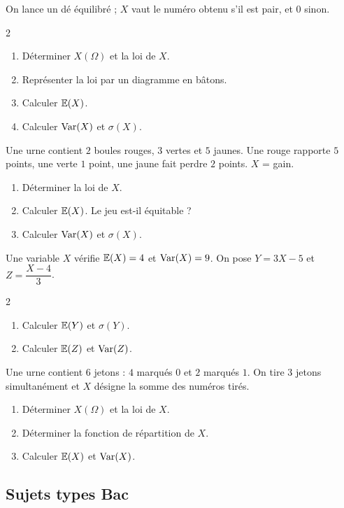On lance un dé équilibré ; $X$ vaut le numéro obtenu s'il est pair, et $0$
sinon.
\begin{multicols}{2}
\begin{enumerate}
	\item Déterminer $X(\Omega)$ et la loi de $X$.
	\item Représenter la loi par un diagramme en bâtons.
	\item Calculer $\mathbb{E}(X)$.
	\item Calculer $\mathrm{Var}(X)$ et $\sigma(X)$.
\end{enumerate}
\end{multicols}

Une urne contient $2$ boules rouges, $3$ vertes et $5$ jaunes. Une rouge
rapporte $5$ points, une verte $1$ point, une jaune fait perdre $2$ points.
$X$ = gain.
\begin{enumerate}
	\item Déterminer la loi de $X$.
	\item Calculer $\mathbb{E}(X)$. Le jeu est-il équitable ?
	\item Calculer $\mathrm{Var}(X)$ et $\sigma(X)$.
\end{enumerate}

Une variable $X$ vérifie $\mathbb{E}(X)=4$ et $\mathrm{Var}(X)=9$. On pose $Y=3X-5$ et
$Z=\dfrac{X-4}{3}$.
\begin{multicols}{2}
\begin{enumerate}
	\item Calculer $\mathbb{E}(Y)$ et $\sigma(Y)$.
	\item Calculer $\mathbb{E}(Z)$ et $\mathrm{Var}(Z)$.
\end{enumerate}
\end{multicols}

Une urne contient $6$ jetons : $4$ marqués $0$ et $2$ marqués $1$. On tire
$3$ jetons simultanément et $X$ désigne la somme des numéros tirés.
\begin{enumerate}
	\item Déterminer $X(\Omega)$ et la loi de $X$.
	\item Déterminer la fonction de répartition de $X$.
	\item Calculer $\mathbb{E}(X)$ et $\mathrm{Var}(X)$.
\end{enumerate}

\subsection{Sujets types Bac}

